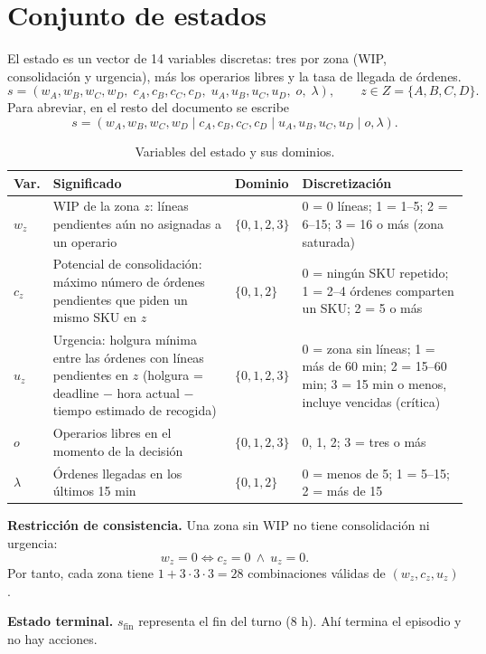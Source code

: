 \documentclass[11pt,letterpaper]{article}
\newcommand{\sfin}{s_{\mathrm{fin}}}
\begin{document}
\section{Conjunto de estados}

El estado es un vector de 14 variables discretas: tres por zona (WIP, consolidación y urgencia),
más los operarios libres y la tasa de llegada de órdenes.
\[
  s = (w_A, w_B, w_C, w_D,\; c_A, c_B, c_C, c_D,\; u_A, u_B, u_C, u_D,\; o,\; \lambda),
  \qquad z \in Z = \{A,B,C,D\}.
\]
Para abreviar, en el resto del documento se escribe
\[ s = (w_A,w_B,w_C,w_D \mid c_A,c_B,c_C,c_D \mid u_A,u_B,u_C,u_D \mid o,\lambda). \]

\begin{table}[h]
\centering\small
\begin{tabularx}{\textwidth}{@{}p{1cm}Lp{1.9cm}L@{}}
\toprule
\textbf{Var.} & \textbf{Significado} & \textbf{Dominio} & \textbf{Discretización} \\
\midrule
$w_z$ & WIP de la zona $z$: líneas pendientes aún no asignadas a un operario & $\{0,1,2,3\}$ &
  0 = 0 líneas; 1 = 1--5; 2 = 6--15; 3 = 16 o más (zona saturada) \\
$c_z$ & Potencial de consolidación: máximo número de órdenes pendientes que piden un mismo SKU en $z$ & $\{0,1,2\}$ &
  0 = ningún SKU repetido; 1 = 2--4 órdenes comparten un SKU; 2 = 5 o más \\
$u_z$ & Urgencia: holgura mínima entre las órdenes con líneas pendientes en $z$ (holgura = deadline $-$ hora actual $-$ tiempo estimado de recogida) & $\{0,1,2,3\}$ &
  0 = zona sin líneas; 1 = más de 60 min; 2 = 15--60 min; 3 = 15 min o menos, incluye vencidas (crítica) \\
$o$ & Operarios libres en el momento de la decisión & $\{0,1,2,3\}$ & 0, 1, 2; 3 = tres o más \\
$\lambda$ & Órdenes llegadas en los últimos 15 min & $\{0,1,2\}$ & 0 = menos de 5; 1 = 5--15; 2 = más de 15 \\
\bottomrule
\end{tabularx}
\caption{Variables del estado y sus dominios.}
\end{table}

\textbf{Restricción de consistencia.} Una zona sin WIP no tiene consolidación ni urgencia:
\[
  w_z = 0 \iff c_z = 0 \ \wedge\ u_z = 0 .
\]
Por tanto, cada zona tiene $1 + 3\cdot3\cdot3 = 28$ combinaciones válidas de $(w_z,c_z,u_z)$.

\textbf{Estado terminal.} $\sfin$ representa el fin del turno (8 h). Ahí termina el episodio y no hay acciones.
\end{document}
